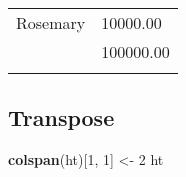 \documentclass[]{article}
\newenvironment{Shaded}{\begin{snugshade}}{\end{snugshade}}
\newcommand{\KeywordTok}[1]{\textcolor[rgb]{0.13,0.29,0.53}{\textbf{{#1}}}}
\newcommand{\DecValTok}[1]{\textcolor[rgb]{0.00,0.00,0.81}{{#1}}}
\newcommand{\StringTok}[1]{\textcolor[rgb]{0.31,0.60,0.02}{{#1}}}
\newcommand{\NormalTok}[1]{{#1}}
\begin{document}
\begin{table}[h]
\begin{centering}
\begin{tabularx}{0.25\textwidth}{p{} p{}}
\multicolumn{1}{|p{0.125\textwidth}|}{\raggedright\rule{0pt}{\baselineskip+4pt}\hspace*{4pt}Rosemary\hspace*{4pt}\rule[-4pt]{0pt}{4pt}} & \multicolumn{1}{p{0.125\textwidth}|}{\raggedright\rule{0pt}{\baselineskip+4pt}\hspace*{4pt}10000.00\hspace*{4pt}\rule[-4pt]{0pt}{4pt}} \tabularnewline[-0.5pt]
\hhline{>{\arrayrulecolor{black}}|>{\arrayrulecolor{black}}->{\arrayrulecolor{black}}|>{\arrayrulecolor{black}}-}
\arrayrulecolor{black}
\multicolumn{1}{|p{0.125\textwidth}|}{\raggedright\rule{0pt}{\baselineskip+4pt}\hspace*{4pt}Thyme\hspace*{4pt}\rule[-4pt]{0pt}{4pt}} & \multicolumn{1}{p{0.125\textwidth}|}{\raggedright\rule{0pt}{\baselineskip+4pt}\hspace*{4pt}100000.00\hspace*{4pt}\rule[-4pt]{0pt}{4pt}} \tabularnewline[-0.5pt]
\hhline{>{\arrayrulecolor{black}}|>{\arrayrulecolor{black}}->{\arrayrulecolor{black}}|>{\arrayrulecolor{black}}-}
\arrayrulecolor{black}
\end{tabularx}
\par\end{centering}
\end{table}

\FloatBarrier

\subsection{Transpose}\label{transpose}

\begin{Shaded}
\begin{Highlighting}[]
\KeywordTok{colspan}\NormalTok{(ht)[}\DecValTok{1}\NormalTok{, }\DecValTok{1}\NormalTok{] <-}\StringTok{ }\DecValTok{2}
\NormalTok{ht}
\end{Highlighting}
\end{Shaded}
\end{document}
